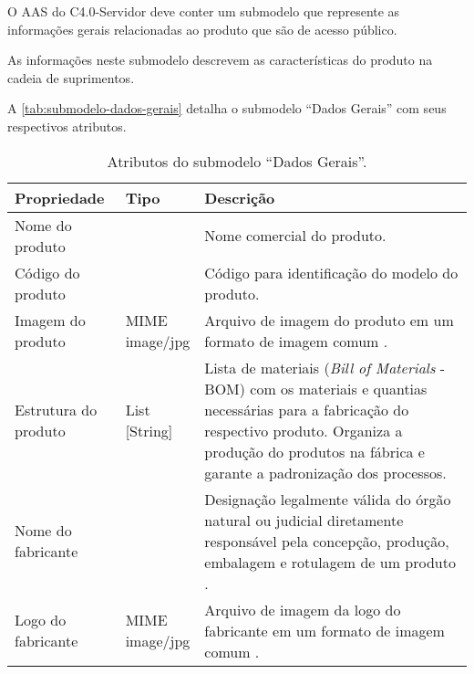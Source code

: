 O AAS do C4.0-Servidor deve conter um submodelo que represente as informações gerais relacionadas ao produto que são de acesso público.

As informações neste submodelo descrevem as características do produto na cadeia de suprimentos.

A \autoref{tab:submodelo-dados-gerais} detalha o submodelo ``Dados Gerais'' com seus respectivos atributos.

\begin{table}[htb]
	\centering
	\caption{Atributos do submodelo ``Dados Gerais''.}
	\begin{tabular}{p{3.5cm}p{1.5cm}p{9cm}}
		\hline
		\textbf{Propriedade}
		 & \textbf{Tipo}
		 & \textbf{Descrição}                                                                                                                                                                                                        \\

		\hline
		Nome do produto
		 & \makecell{String}
		 & Nome comercial do produto.
		\\

		\hline
		Código do produto
		 & \makecell{String}
		 & Código para identificação do modelo do produto.
		\\

		\hline
		Imagem do produto
		 & \makecell{MIME\\{image/jpg}}
		 & Arquivo de imagem do produto em um formato de imagem comum \citeonline{bader2020submodel}.
		\\

		\hline
		Estrutura do produto
		 & \makecell{List\\{[String]}}
		 & Lista de materiais (\textit{Bill of Materials} - BOM) com os materiais e quantias necessárias para a fabricação do respectivo produto. Organiza a produção do produtos na fábrica e garante a padronização dos processos. \\


		\hline
		Nome do fabricante
		 & \makecell{String}
		 & Designação legalmente válida do órgão natural ou judicial diretamente responsável pela concepção, produção, embalagem e rotulagem de um produto \citeonline{bader2020submodel}.
		\\

		\hline
		Logo do fabricante
		 & \makecell{MIME\\{image/jpg}}
		 & Arquivo de imagem da logo do fabricante em um formato de imagem comum \citeonline{bader2020submodel}.
		\\

		\hline
	\end{tabular}
	\label{tab:submodelo-dados-gerais}
\end{table}


